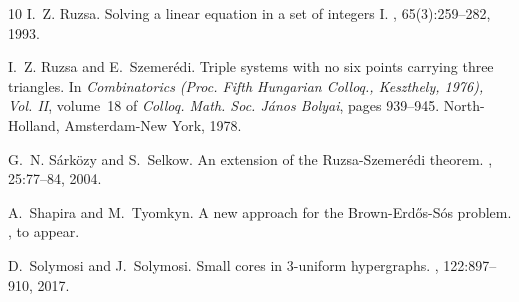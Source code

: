 \documentclass{daj}
\theoremstyle{plain}
\theoremstyle{remark}
\begin{document}
\begin{thebibliography}{10}
I.~Z. Ruzsa.
\newblock Solving a linear equation in a set of integers {I}.
, 65(3):259--282, 1993.

I.~Z. Ruzsa and E.~Szemer\'{e}di.
\newblock Triple systems with no six points carrying three triangles.
\newblock In {\em Combinatorics ({P}roc. {F}ifth {H}ungarian {C}olloq.,
  {K}eszthely, 1976), {V}ol. {II}}, volume~18 of {\em Colloq. Math. Soc.
  J\'{a}nos Bolyai}, pages 939--945. North-Holland, Amsterdam-New York, 1978.

G.~N. S{\'a}rk{\"o}zy and S.~Selkow.
\newblock An extension of the {R}uzsa-{S}zemer{\'e}di theorem.
, 25:77--84, 2004.

A.~Shapira and M.~Tyomkyn.
\newblock A new approach for the {B}rown-{E}rd{\H{o}}s-{S}\'{o}s problem.
, to appear.

D.~Solymosi and J.~Solymosi.
\newblock Small cores in 3-uniform hypergraphs.
, 122:897--910, 2017.

\end{thebibliography}
\end{document}
